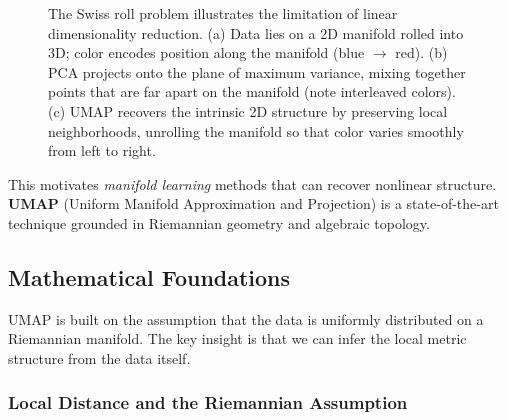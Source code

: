 \begin{figure}[h]
\caption{The Swiss roll problem illustrates the limitation of linear dimensionality reduction. (a) Data lies on a 2D manifold rolled into 3D; color encodes position along the manifold (blue $\to$ red). (b) PCA projects onto the plane of maximum variance, mixing together points that are far apart on the manifold (note interleaved colors). (c) UMAP recovers the intrinsic 2D structure by preserving local neighborhoods, unrolling the manifold so that color varies smoothly from left to right.}
\label{fig:swiss-roll}
\end{figure}

This motivates \emph{manifold learning} methods that can recover nonlinear structure. \textbf{UMAP} (Uniform Manifold Approximation and Projection) is a state-of-the-art technique grounded in Riemannian geometry and algebraic topology.

\subsection{Mathematical Foundations}

UMAP is built on the assumption that the data is uniformly distributed on a Riemannian manifold. The key insight is that we can infer the local metric structure from the data itself.

\subsubsection{Local Distance and the Riemannian Assumption}

